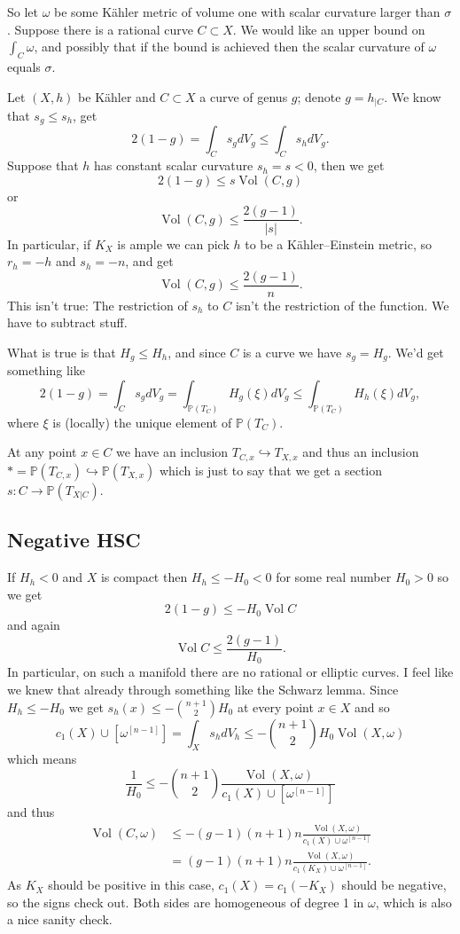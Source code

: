 \documentclass{amsart}
\numberwithin{equation}{section}
\theoremstyle{definition}
\DeclareMathOperator{\Vol}{Vol}
\begin{document}
So let $\omega$ be some K\"ahler metric of volume one with scalar curvature
larger than $\sigma$.
Suppose there is a rational curve $C \subset X$.
We would like an upper bound on $\int_C \omega$, and possibly that if the bound is achieved then the scalar curvature of $\omega$ equals $\sigma$.


Let $(X,h)$ be K\"ahler and $C \subset X$ a curve of genus $g$;
denote $g = h_{|C}$.
We know that $s_g \leq s_h$, get
$$
2(1-g)
= \int_C s_g dV_g
\leq \int_C s_h dV_g.
$$
Suppose that $h$ has constant scalar curvature $s_h = s < 0$, then we get
$$
2(1-g)
\leq s \Vol(C,g)
$$
or
$$
\Vol(C,g)
\leq \frac{2(g-1)}{|s|}.
$$
In particular, if $K_X$ is ample we can pick $h$ to be a K\"ahler--Einstein
metric, so $r_h = -h$ and $s_h = -n$, and get
$$
\Vol(C,g) \leq \frac{2(g-1)}{n}.
$$
This isn't true: The restriction of $s_h$ to $C$ isn't the restriction of the function. We have to subtract stuff.

What is true is that $H_g \leq H_h$, and since $C$ is a curve we have $s_g = H_g$.
We'd get something like
$$
2(1-g)
= \int_C s_g dV_g
= \int_{\mathbb P(T_C)} H_g(\xi) dV_g
\leq \int_{\mathbb P(T_C)} H_h(\xi) dV_g,
$$
\def\kk#1{\mathbb{#1}}%
where $\xi$ is (locally) the unique element of $\mathbb P(T_C)$.

At any point $x \in C$ we have an inclusion $T_{C,x} \hookrightarrow T_{X,x}$
and thus an inclusion $* = \kk P(T_{C,x}) \hookrightarrow \kk P(T_{X,x})$
which is just to say that we get a section $s : C \to \kk P(T_{X|C})$.



\subsection*{Negative HSC}
If $H_h < 0$ and $X$ is compact then $H_h \leq -H_0 < 0$ for some real number $H_0 > 0$
so we get
$$
2(1-g) \leq -H_0 \Vol C
$$
and again
$$
\Vol C \leq \frac{2(g-1)}{H_0}.
$$
In particular, on such a manifold there are no rational or elliptic curves.
I feel like we knew that already through something like the Schwarz lemma.
Since $H_h \leq -H_0$ we get $s_h(x) \leq - \binom{n+1}{2} H_0$ at every point
$x \in X$ and so
$$
c_1(X) \cup [\omega^{[n-1]}]
= \int_X s_h dV_h
\leq - \binom{n+1}{2} H_0 \Vol(X, \omega)
$$
which means
$$
\frac{1}{H_0}
\leq -\binom{n+1}{2} \frac{\Vol(X, \omega)}{c_1(X) \cup [\omega^{[n-1]}]}
$$
and thus
\begin{align*}
\Vol(C,\omega)
&\leq - (g-1) (n+1)n
\frac{\Vol(X, \omega)}{c_1(X) \cup \omega^{[n-1]}}
\\
&= (g-1) (n+1)n
\frac{\Vol(X, \omega)}{c_1(K_X) \cup \omega^{[n-1]}}.
\end{align*}
As $K_X$ should be positive in this case, $c_1(X) = c_1(-K_X)$ should be negative,
so the signs check out.
Both sides are homogeneous of degree 1 in $\omega$, which is also a nice sanity check.
\end{document}
